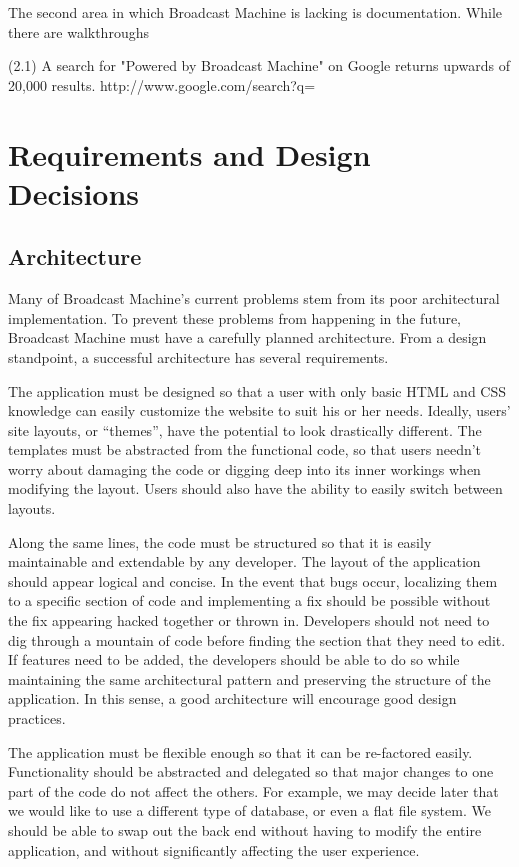 \documentclass[a4paper,12pt]{report}
\begin{document}
	The second area in which Broadcast Machine is lacking is documentation. While there are walkthroughs  
	

(2.1) A search for "Powered by Broadcast Machine" on Google returns upwards of 20,000 results.
http://www.google.com/search?q=%

\chapter{Requirements and Design Decisions}

\section{Architecture}

	Many of Broadcast Machine’s current problems stem from its poor architectural implementation. To prevent these problems from happening in the future, Broadcast Machine must have a carefully planned architecture. From a design standpoint, a successful architecture has several requirements.

The application must be designed so that a user with only basic HTML and CSS knowledge can easily customize the website to suit his or her needs. Ideally, users’ site layouts, or “themes”, have the potential to look drastically different. The templates must be abstracted from the functional code, so that users needn’t worry about damaging the code or digging deep into its inner workings when modifying the layout. Users should also have the ability to easily switch between layouts.

Along the same lines, the code must be structured so that it is easily maintainable and extendable by any developer. The layout of the application should appear logical and concise. In the event that bugs occur, localizing them to a specific section of code and implementing a fix should be possible without the fix appearing hacked together or thrown in. Developers should not need to dig through a mountain of code before finding the section that they need to edit. If features need to be added, the developers should be able to do so while maintaining the same architectural pattern and preserving the structure of the application. In this sense, a good architecture will encourage good design practices.

The application must be flexible enough so that it can be re-factored easily. Functionality should be abstracted and delegated so that major changes to one part of the code do not affect the others. For example, we may decide later that we would like to use a different type of database, or even a flat file system. We should be able to swap out the back end without having to modify the entire application, and without significantly affecting the user experience.
\end{document}
